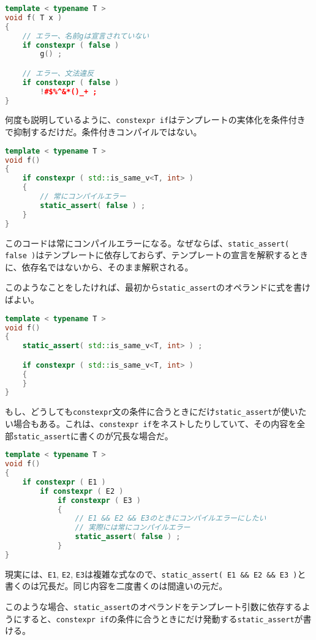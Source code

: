 \begin{lstlisting}[language=C++]
template < typename T >
void f( T x )
{
    // エラー、名前gは宣言されていない
    if constexpr ( false )
        g() ; 

    // エラー、文法違反
    if constexpr ( false )
        !#$%^&*()_+ ;
}
\end{lstlisting}

何度も説明しているように、\lstinline!constexpr if!はテンプレートの実体化を条件付きで抑制するだけだ。条件付きコンパイルではない。

\begin{lstlisting}[language=C++]
template < typename T >
void f()
{
    if constexpr ( std::is_same_v<T, int> )
    {
        // 常にコンパイルエラー
        static_assert( false ) ;
    }
}
\end{lstlisting}

このコードは常にコンパイルエラーになる。なぜならば、\lstinline!static_assert( false )!はテンプレートに依存しておらず、テンプレートの宣言を解釈するときに、依存名ではないから、そのまま解釈される。

このようなことをしたければ、最初から\lstinline!static_assert!のオペランドに式を書けばよい。

\begin{lstlisting}[language=C++]
template < typename T >
void f()
{
    static_assert( std::is_same_v<T, int> ) ;

    if constexpr ( std::is_same_v<T, int> )
    {
    }
}
\end{lstlisting}

もし、どうしても\lstinline!constexpr!文の条件に合うときにだけ\lstinline!static_assert!が使いたい場合もある。これは、\lstinline!constexpr if!をネストしたりしていて、その内容を全部\lstinline!static_assert!に書くのが冗長な場合だ。

\begin{lstlisting}[language=C++]
template < typename T >
void f()
{
    if constexpr ( E1 )
        if constexpr ( E2 )
            if constexpr ( E3 )
            {
                // E1 && E2 && E3のときにコンパイルエラーにしたい
                // 実際には常にコンパイルエラー
                static_assert( false ) ;
            }
}
\end{lstlisting}

現実には、\lstinline!E1!, \lstinline!E2!,
\lstinline!E3!は複雑な式なので、\lstinline!static_assert( E1 && E2 && E3 )!と書くのは冗長だ。同じ内容を二度書くのは間違いの元だ。

このような場合、\lstinline!static_assert!のオペランドをテンプレート引数に依存するようにすると、\lstinline!constexpr if!の条件に合うときにだけ発動する\lstinline!static_assert!が書ける。

